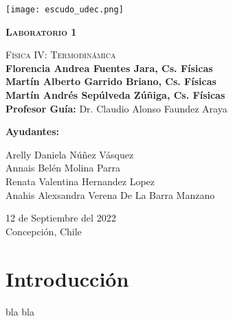 \documentclass[twoside]{report}
\begin{document}

\begin{titlepage}
  \thispagestyle{frontpage}
 \begin{center}
     \texttt{[image: escudo\_udec.png]}
     
     \vspace*{3\baselineskip}
  \textsc{\Huge \textbf{Laboratorio 1}}
  
     \vspace*{1.5\baselineskip}
  \textsc{\Huge Física IV: Termodinámica}\\

     \vspace*{4\baselineskip}
  \Large{\textbf{Florencia Andrea Fuentes Jara, Cs. Físicas\\ Martín Alberto Garrido Briano, Cs. Físicas \\ Martín Andrés Sepúlveda Zúñiga, Cs. Físicas}}\\ 
    \vspace{2\baselineskip}
 \Large{\textbf{Profesor Guía:} Dr. Claudio Alonso Faundez Araya}\\
     \vspace{1\baselineskip}
     \begin{center}
        \justify\Large{\textbf{Ayudantes:} 
        
    Arelly Daniela Núñez Vásquez  \\ Annais Belén Molina Parra \\  Renata Valentina Hernandez Lopez \\ Anahis Alexsandra Verena De La Barra Manzano}
    \vspace{2\baselineskip} 
     \end{center}
 
    
         12 de Septiembre del 2022 \\
            Concepción, Chile 
\end{center}
  
  \vspace*{4\baselineskip}
  
\end{titlepage}
 
 \chapter*{Introducción}
bla bla
\end{document}
